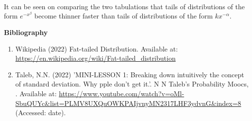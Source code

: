 \documentclass[14pt, a4paper]{article}
\theoremstyle{definition}
\begin{document}
 \\
 \\
 \\
It can be seen on comparing the two tabulations that tails of distributions of the form $e^{-x^\beta}$ become thinner faster than tails of distributions of the form $k{x^{- \alpha}}$.

\newpage
\begin{center}
    \Large{\textbf{Bibliography}}
\end{center}

\begin{enumerate}
    \item Wikipedia (2022) Fat-tailed Distribution. Available at: \url{https://en.wikipedia.org/wiki/Fat-tailed_distribution}
    \item Taleb, N.N. (2022) 'MINI-LESSON 1: Breaking down intuitively the concept of standard deviation. Why pple don't get it.'. N N Taleb’s Probability Moocs, . Available at: \url{https://www.youtube.com/watch?v=oMl-SbuQUYc&list=PLMV8UXQuOWKPAIjvnyMN2317LHF3ydvnG&index=8} (Accessed: date).
    

\end{enumerate}
\end{document}
